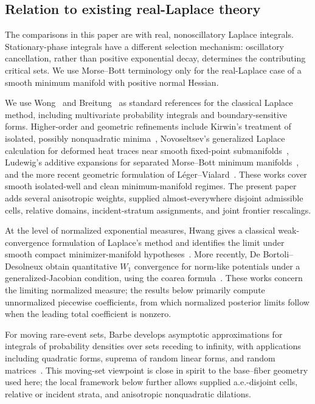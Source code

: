 \documentclass[11pt]{amsart}
\numberwithin{equation}{section}
\theoremstyle{definition}
\theoremstyle{remark}
\begin{document}
\subsection*{Relation to existing real-Laplace theory}

The comparisons in this paper are with real, nonoscillatory Laplace integrals.
Stationary-phase integrals have a different selection mechanism: oscillatory
cancellation, rather than positive exponential decay, determines the contributing
critical sets.  We use Morse--Bott terminology only for the real-Laplace case of
a smooth minimum manifold with positive normal Hessian.

We use Wong~\cite{Wong} and Breitung~\cite{Breitung} as standard
references for the classical Laplace method, including multivariate
probability integrals and boundary-sensitive forms.  Higher-order and geometric
refinements include Kirwin's treatment of isolated, possibly nonquadratic
minima~\cite{Kirwin}, Novoseltsev's generalized Laplace calculation for
deformed heat traces near smooth fixed-point submanifolds~\cite{Novoseltsev},
Ludewig's additive expansions for separated Morse--Bott minimum
manifolds~\cite{Ludewig}, and the more recent geometric formulation of
L\'eger--Vialard~\cite{LegerVialard}.  These works cover smooth
isolated-well and clean minimum-manifold regimes.  The present paper adds
several anisotropic weights, supplied almost-everywhere disjoint admissible
cells, relative domains, incident-stratum assignments, and joint frontier
rescalings.

At the level of normalized exponential measures, Hwang gives a classical
weak-convergence formulation of Laplace's method and identifies the limit under
smooth compact minimizer-manifold hypotheses~\cite{Hwang}.  More recently, De
Bortoli--Desolneux obtain quantitative $W_1$ convergence for norm-like
potentials under a generalized-Jacobian condition, using the coarea
formula~\cite{DeBortoliDesolneux}.  These works concern the limiting normalized
measure; the results below primarily compute unnormalized piecewise
coefficients, from which normalized posterior limits follow when the leading
total coefficient is nonzero.

For moving rare-event sets, Barbe develops asymptotic approximations for
integrals of probability densities over sets receding to infinity, with
applications including quadratic forms, suprema of random linear forms, and
random matrices~\cite{BarbeAsymptoticSets}.  This moving-set viewpoint is close
in spirit to the base--fiber geometry used here; the local framework below
further allows supplied a.e.-disjoint cells, relative or incident strata, and
anisotropic nonquadratic dilations.
\end{document}
